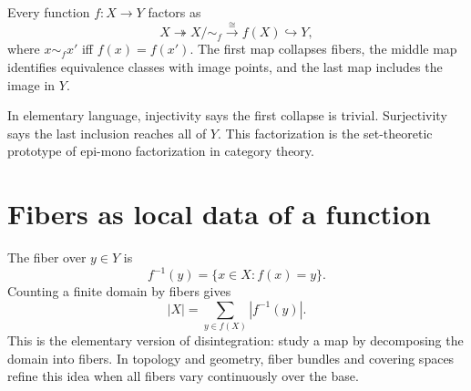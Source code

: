 Every function $f:X\to Y$ factors as
\[
  X\twoheadrightarrow X/{\sim_f} \xrightarrow{\cong} f(X) \hookrightarrow Y,
\]
where $x\sim_f x'$ iff $f(x)=f(x')$.  The first map collapses fibers, the middle map identifies equivalence classes with image points, and the last map includes the image in $Y$.

In elementary language, injectivity says the first collapse is trivial.  Surjectivity says the last inclusion reaches all of $Y$.  This factorization is the set-theoretic prototype of epi-mono factorization in category theory.

\section{Fibers as local data of a function}

The fiber over $y\in Y$ is
\[
  f^{-1}(y)=\{x\in X:f(x)=y\}.
\]
Counting a finite domain by fibers gives
\[
  |X|=\sum_{y\in f(X)}|f^{-1}(y)|.
\]
This is the elementary version of disintegration: study a map by decomposing the domain into fibers.  In topology and geometry, fiber bundles and covering spaces refine this idea when all fibers vary continuously over the base.

